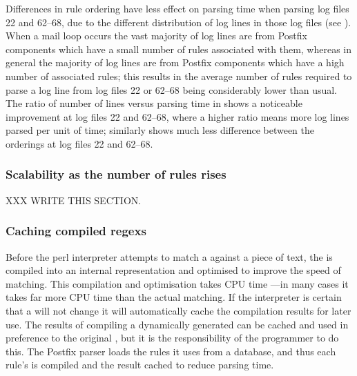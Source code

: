 
Differences in rule ordering have less effect on parsing time when parsing
log files 22 and 62--68, due to the different distribution of log lines in
those log files (see ).
When a mail loop occurs the vast majority of log lines are from Postfix
components which have a small number of rules associated with them, whereas
in general the majority of log lines are from Postfix components which have
a high number of associated rules; this results in the average number of
rules required to parse a log line from log files 22 or 62--68 being
considerably lower than usual.  The ratio of number of lines versus parsing
time in  shows a
noticeable improvement at log files 22 and 62--68, where a higher ratio
means more log lines parsed per unit of time; similarly  shows much less difference
between the orderings at log files 22 and 62--68.

\subsubsection{Scalability as the number of rules rises}

\label{scalability as the number of rules rises}

XXX WRITE THIS SECTION\@.


\clearpage{}

\subsubsection{Caching compiled regexs}

\label{Caching compiled regexes}

Before the perl interpreter attempts to match a \regex{} against a piece of
text, the \regex{} is compiled into an internal representation and
optimised to improve the speed of matching.  This compilation and
optimisation takes CPU time ---in many cases it takes far more CPU time
than the actual matching.  If the interpreter is certain that a \regex{}
will not change it will automatically cache the compilation results for
later use.   The results of compiling a dynamically generated \regex{} can
be cached and used in preference to the original \regex{}, but it is the
responsibility of the programmer to do this.  The Postfix parser loads the
rules it uses from a database, and thus each rule's \regex{} is compiled
and the result cached to reduce parsing time.

